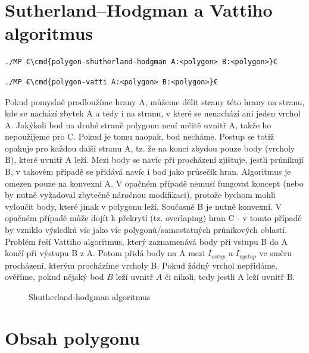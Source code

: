 \documentclass[a4paper,12pt]{report}
\newcommand{\cmd}[1]{\textcolor{blue}{\textbf{#1}}}
\begin{document}
\section{Sutherland–Hodgman a Vattiho algoritmus}

\begin{lstlisting}
./MP €\cmd{polygon-shutherland-hodgman A:<polygon> B:<polygon>}€
\end{lstlisting}
\begin{lstlisting}
./MP €\cmd{polygon-vatti A:<polygon> B:<polygon>}€
\end{lstlisting}

Pokud pomyslně prodloužíme hrany A, můžeme dělit strany této hrany na stranu, kde se nachází zbytek A a tedy i na stranu, v které se nenachází ani jeden vrchol A. Jakýkoli bod na  druhé straně polygonu není určitě uvnitř A, takže ho nepoužijeme pro C. Pokud je tomu naopak, bod necháme. Postup se totiž opakuje pro každou další stranu A, tz. že na konci zbydou pouze body (vrcholy B), které uvnitř A leží. Mezi body se navíc při procházení zjištuje, jestli průnikují B, v takovém případě se přidává navíc i bod jako průsečík hran. Algoritmus je omezen pouze na konvexní A. V opačném případě nemusí fungovat koncept (nebo by nutně vyžadoval zbytečně náročnou modifikaci), protože bychom mohli vyloučit body, které jinak v polygonu leží. Současně B je nutně konvexní. V opačném případě může dojít k překrytí (tz. overlaping) hran C - v tomto případě by vzniklo výsledků víc jako víc polygonů/samostatných průnikových oblastí. Problém řeší Vattiho algoritmus, který zaznamenává body při vstupu B do A končí při výstupu B z A. Potom přidá body na A mezi $I_{vstup}$ a $I_{vystup}$ ve směru procházení, kterým procházíme vrcholy B.
Pokud žádný vrchol nepřidáme, ověříme, pokud nějaký bod $B$ leží uvnitř $A$ či nikoli, tedy jestli A leží uvnitř B. 




\begin{figure}[H]
  \centering
  
  \caption{Shutherland-hodgman algoritmus}
\end{figure}



\section{Obsah polygonu}
\end{document}
